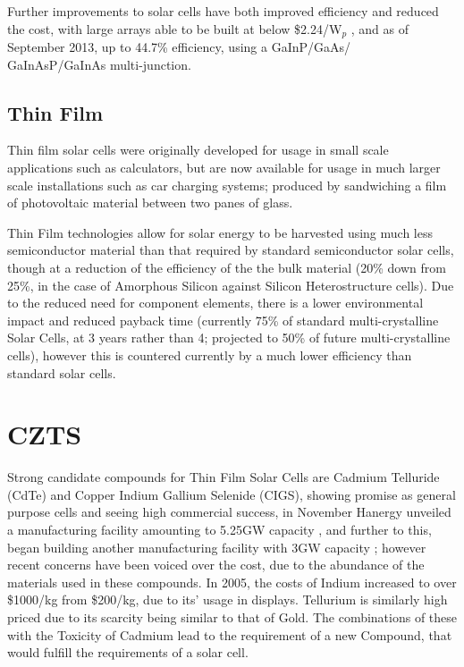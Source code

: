 \documentclass[11pt,a4paper,twoside]{article}
\begin{document}
Further improvements to  solar cells have both improved efficiency and reduced the cost, with large arrays able to be built at below \$2.24/W$_p$ \citep{EricWesoff}, and as of September 2013, up to 44.7\% efficiency, using a GaInP/GaAs/\\GaInAsP/GaInAs multi-junction. \citep{ISI:000331334400001}


\subsection{Thin Film}

Thin film solar cells were originally developed for usage in small scale applications such as calculators, but are now available for usage in much larger scale installations such as car charging systems; produced by sandwiching a film of photovoltaic material between two panes of glass. 

Thin Film technologies allow for solar energy to be harvested using much less semiconductor material than that required by standard semiconductor solar cells, though at a reduction of the efficiency of the the bulk material (20\% down from 25\%, in the case of Amorphous Silicon against Silicon Heterostructure cells)\citep{Photovoltaics2014}. Due to the reduced need for component elements, there is a lower environmental impact and reduced payback time (currently 75\% of standard multi-crystalline Solar Cells, at 3 years rather than 4; projected to 50\% of future multi-crystalline cells)\citep{Photovoltaics}, however this is countered currently by a much lower efficiency than standard solar cells.

\section{CZTS}

Strong candidate compounds for Thin Film Solar Cells are Cadmium Telluride (CdTe) and Copper Indium Gallium Selenide (CIGS), showing promise as general purpose cells and seeing high commercial success, in November Hanergy unveiled a manufacturing facility amounting to 5.25GW capacity \citep{Mark}, and further to this, began building another manufacturing facility with 3GW capacity \citep{FinlayColville}; however recent concerns have been voiced over the cost, due to the abundance of the materials used in these compounds. In 2005, the costs of Indium increased to over \$1000/kg from \$200/kg, due to its' usage in displays. Tellurium is similarly high priced due to its scarcity being similar to that of Gold. The combinations of these with the Toxicity of Cadmium lead to the requirement of a new Compound, that would fulfill the requirements of a solar cell.
\end{document}

